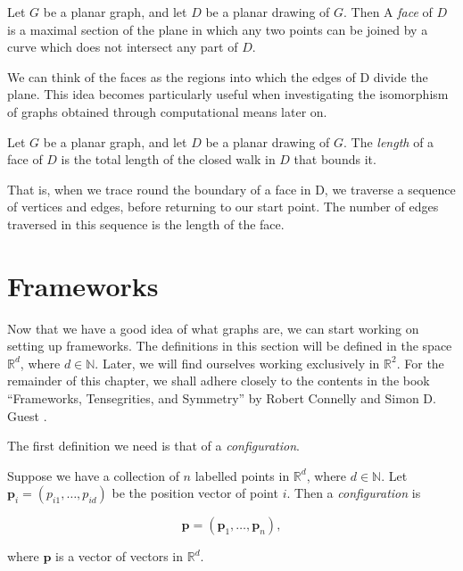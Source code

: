 \begin{definition}
Let $G$ be a planar graph, and let $D$ be a planar drawing of $G$. Then A \textit{face} of $D$ is a maximal section of the plane in which any two points can be joined by a curve which does not intersect any part of $D$. 
\end{definition}

\noindent
We can think of the faces as the regions into which the edges of D divide the plane. This idea becomes particularly useful when investigating the isomorphism of graphs obtained through computational means later on.

\begin{definition}
Let $G$ be a planar graph, and let $D$ be a planar drawing of $G$. The \textit{length} of a face of $D$ is the total length of the closed walk in $D$ that bounds it.
\end{definition}

\noindent
That is, when we trace round the boundary of a face in D, we traverse a
sequence of vertices and edges, before returning to our start point. The number of edges traversed in this sequence is the length of the face.

\section{Frameworks}

\begin{flushleft}
Now that we have a good idea of what graphs are, we can start working on setting up frameworks. The definitions in this section will be defined in the space $\mathbb{R}^d$, where $d \in \mathbb{N}$. Later, we will find ourselves working exclusively in $\mathbb{R}^2$. For the remainder of this chapter, we shall adhere closely to the contents in the book ``Frameworks, Tensegrities, and Symmetry'' by Robert Connelly and Simon D. Guest \cite{textbook}.
\end{flushleft}

\noindent
The first definition we need is that of a \textit{configuration}.

\begin{definition}
    Suppose we have a collection of $n$ labelled points in $\mathbb{R}^d$, where $d \in \mathbb{N}$. Let $\mathbf{p}_i = (p_{i1}, \hdots, p_{id})$ be the position vector of point $i$. Then a \textit{configuration} is

\[
\mathbf{p} = (\mathbf{p}_1, \hdots, \mathbf{p}_n),
\]

\begin{flushleft}
where $\mathbf{p}$ is a vector of vectors in $\mathbb{R}^d$.     
\end{flushleft}
\end{definition}

